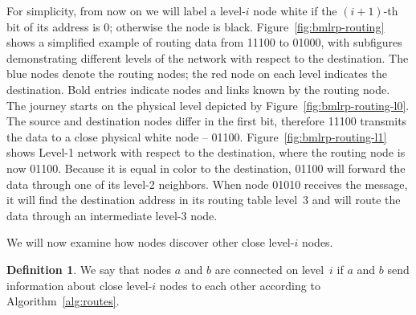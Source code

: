 \documentclass[conference]{IEEEtran}
\theoremstyle{definition}
\newtheorem{defn}{Definition}
\begin{document}


For simplicity, from now on we will label a level-$i$ node white if the $(i+1)$-th bit of its address is 0; otherwise the node is black. Figure~\ref{fig:bmlrp-routing} shows a simplified example of routing data from 11100 to 01000, with subfigures demonstrating different levels of the network with respect to the destination. The blue nodes denote the routing nodes; the red node on each level indicates the destination. Bold entries indicate nodes and links known by the routing node. The journey starts on the physical level depicted by Figure~\ref{fig:bmlrp-routing-l0}. The source and destination nodes differ in the first bit, therefore 11100 transmits the data to a close physical white node -- 01100. Figure~\ref{fig:bmlrp-routing-l1} shows Level-1 network with respect to the destination, where the routing node is now 01100. Because it is equal in color to the destination, 01100 will forward the data through one of its level-2 neighbors. When node 01010 receives the message, it will find the destination address in its routing table level~3 and will route the data through an intermediate level-3 node.

We will now examine how nodes discover other close level-$i$ nodes.

\begin{defn}
    We say that nodes $a$ and $b$ are connected on level~$i$ if $a$ and $b$ send information about close level-$i$ nodes to each other according to Algorithm~\ref{alg:routes}.
    
    \label{defn:connected}
\end{defn}
\end{document}
